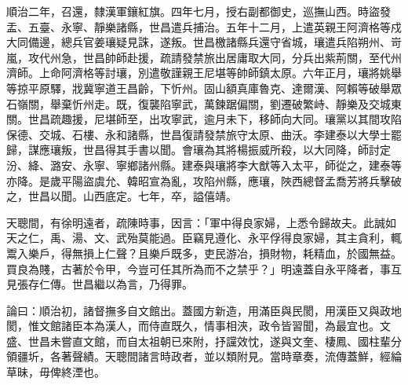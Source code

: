 \begin{pinyinscope}
順治二年，召還，隸漢軍鑲紅旗。四年七月，授右副都御史，巡撫山西。時盜發盂、五臺、永寧、靜樂諸縣，世昌遣兵捕治。五年十二月，上遣英親王阿濟格等戍大同備邊，總兵官姜瓖疑見誅，遂叛。世昌檄諸縣兵還守省城，瓖遣兵陷朔州、岢嵐，攻代州急，世昌帥師赴援，疏請發禁旅出居庸取大同，分兵出紫荊關，至代州濟師。上命阿濟格等討瓖，別遣敬謹親王尼堪等帥師鎮太原。六年正月，瓖將姚舉等掠平原驛，戕冀寧道王昌齡，下忻州。固山額真庫魯克、達爾漢、阿賴等破舉眾石嶺關，舉棄忻州走。既，復襲陷寧武，萬鍊踞偏關，劉遷破繁峙、靜樂及交城東關。世昌疏趣援，尼堪師至，出攻寧武，逾月未下，移師向大同。瓖黨以其間攻陷保德、交城、石樓、永和諸縣，世昌復請發禁旅守太原、曲沃。李建泰以大學士罷歸，謀應瓖叛，世昌得其手書以聞。會瓖為其將楊振威所殺，以大同降，師討定汾、絳、潞安、永寧、寧鄉諸州縣。建泰與瓖將李大猷等入太平，師從之，建泰等亦降。是歲平陽盜虞允、韓昭宣為亂，攻陷州縣，應瓖，陜西總督孟喬芳將兵擊破之，世昌以聞。山西底定。七年，卒，謚僖靖。

天聰間，有徐明遠者，疏陳時事，因言：「軍中得良家婦，上悉令歸故夫。此誠如天之仁，禹、湯、文、武殆莫能過。臣竊見遵化、永平俘得良家婦，其主貪利，輒鬻入樂戶，得無損上仁聲？且樂戶既多，吏民游冶，損財物，耗精血，於國無益。買良為賤，古著於令甲，今豈可任其所為而不之禁乎？」明遠蓋自永平降者，事互見張存仁傳。世昌繼以為言，乃得罪。

論曰：順治初，諸督撫多自文館出。蓋國方新造，用滿臣與民閡，用漢臣又與政地閡，惟文館諸臣本為漢人，而侍直既久，情事相浹，政令皆習聞，為最宜也。文盛、世昌未嘗直文館，而自太祖朝已來附，抒讜效忱，遂與文奎、棲鳳、國柱輩分領疆圻，各著聲績。天聰間諸言時政者，並以類附見。當時章奏，流傳蓋鮮，經綸草昧，毋俾終湮也。


\end{pinyinscope}